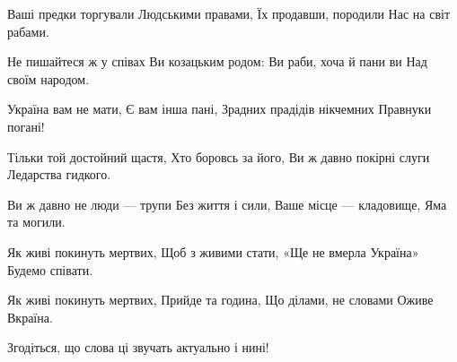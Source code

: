 Ваші предки торгували
Людськими правами,
Їх продавши, породили
Нас на світ рабами.

Не пишайтеся ж у співах
Ви козацьким родом:
Ви раби, хоча й пани ви
Над своїм народом.

Україна вам не мати,
Є вам інша пані,
Зрадних прадідів нікчемних
Правнуки погані!

Тільки той достойний щастя,
Хто боровсь за його,
Ви ж давно покірні слуги
Ледарства гидкого.

Ви ж давно не люди — трупи
Без життя і сили,
Ваше місце — кладовище,
Яма та могили.

Як живі покинуть мертвих,
Щоб з живими стати,
«Ще не вмерла Україна»
Будемо співати.

Як живі покинуть мертвих,
Прийде та година,
Що ділами, не словами
Оживе Вкраїна.

Згодіться, що слова ці звучать актуально і нині!
